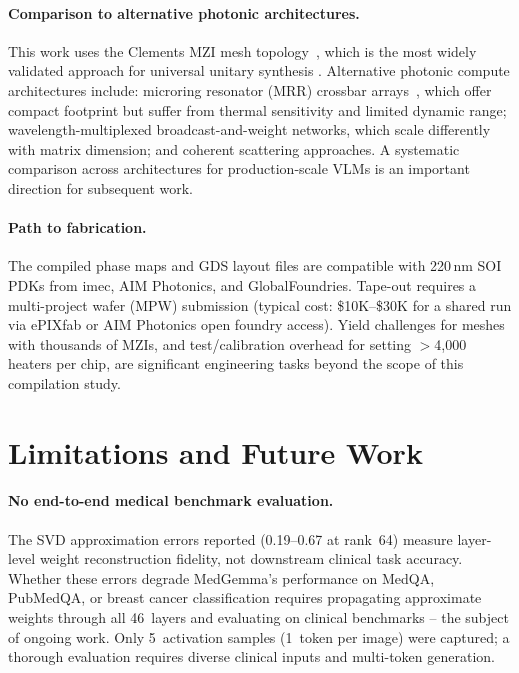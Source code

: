 \documentclass[journal]{IEEEtran}
\begin{document}
\paragraph{Comparison to alternative photonic architectures.}
This work uses the Clements MZI mesh topology~\cite{clements2016}, which is
the most widely validated approach for universal unitary synthesis
\cite{shen2017, pai2023}.
Alternative photonic compute architectures include:
microring resonator (MRR) crossbar arrays~\cite{tait2017}, which offer
compact footprint but suffer from thermal sensitivity and limited dynamic
range;
wavelength-multiplexed broadcast-and-weight networks, which scale differently
with matrix dimension;
and coherent scattering approaches.
A systematic comparison across architectures for production-scale VLMs is
an important direction for subsequent work.

\paragraph{Path to fabrication.}
The compiled phase maps and GDS layout files are compatible with 220\,nm SOI
PDKs from imec, AIM Photonics, and GlobalFoundries.
Tape-out requires a multi-project wafer (MPW) submission (typical cost:
\$10K--\$30K for a shared run via ePIXfab or AIM Photonics open foundry
access).
Yield challenges for meshes with thousands of MZIs, and test/calibration
overhead for setting $>$4,000 heaters per chip, are significant engineering
tasks beyond the scope of this compilation study.

\section{Limitations and Future Work}
\label{sec:limitations}

\paragraph{No end-to-end medical benchmark evaluation.}
The SVD approximation errors reported (0.19--0.67 at rank~64) measure
layer-level weight reconstruction fidelity, not downstream clinical
task accuracy.
Whether these errors degrade MedGemma's performance on MedQA, PubMedQA,
or breast cancer classification requires propagating approximate weights
through all 46~layers and evaluating on clinical benchmarks -- the subject
of ongoing work.
Only 5~activation samples (1~token per image) were captured; a thorough
evaluation requires diverse clinical inputs and multi-token generation.
\end{document}
